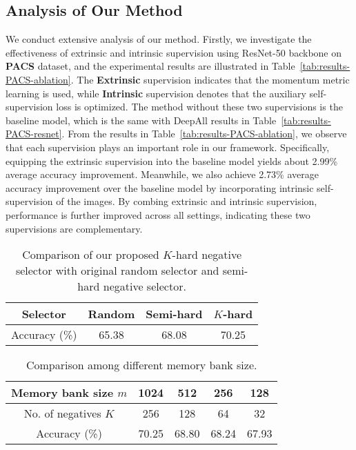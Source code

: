 \subsection{Analysis of Our Method}
We conduct extensive analysis of our method.  
Firstly, we investigate the effectiveness of extrinsic and intrinsic supervision using ResNet-50 backbone on \textbf{PACS} dataset, and the experimental results are illustrated in Table~\ref{tab:results-PACS-ablation}.
The \textbf{Extrinsic} supervision indicates that the momentum metric learning is used, while \textbf{Intrinsic} supervision denotes that the auxiliary self-supervision loss is optimized. 
The method without these two supervisions is the baseline model, which is the same with DeepAll results in Table~\ref{tab:results-PACS-resnet}.
From the results in Table~\ref{tab:results-PACS-ablation}, we observe that each supervision plays an important role in our framework.
Specifically, equipping the extrinsic supervision into the baseline model yields about 2.99\% average accuracy improvement.
Meanwhile, we also achieve 2.73\% average accuracy improvement over the baseline model by incorporating intrinsic self-supervision of the images.
By combing extrinsic and intrinsic supervision, performance is further improved across all settings, indicating these two supervisions are complementary. 





\begin{table*} [!t]
	\centering
	\caption{Comparison of our proposed $K$-hard negative selector with original random selector and semi-hard negative selector.}
	\label{tab:results-ablation-selector}
{
		\setlength\tabcolsep{1.5pt}
		\begin{tabular}{c|ccc}
			\toprule[1pt]
			\T
			Selector & Random & Semi-hard & $K$-hard \\ \hline \T
			Accuracy (\%) &65.38 &68.08&70.25   \\
			\toprule[1pt]
		\end{tabular}
	}
\end{table*}
\begin{table*} [!t]
	\centering
	\caption{Comparison among different memory bank size.}
	\label{tab:results-ablation-bank}
{
		\setlength\tabcolsep{1.5pt}
		\begin{tabular}{c|cccc}
			\toprule[1pt]
			\T
			Memory bank size $m$ & 1024 & 512 & 256 & 128 \\ \hline
			No. of negatives $K$ & 256 & 128 & 64 & 32\\ \hline
			\T 
			Accuracy (\%) &70.25 &68.80&68.24 & 67.93   \\
			\toprule[1pt]
		\end{tabular}
	}
\end{table*}


